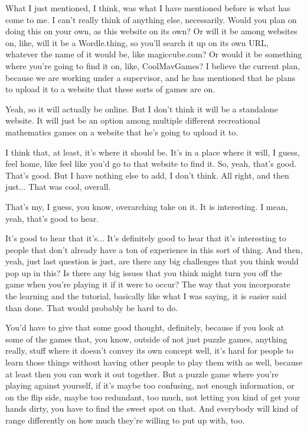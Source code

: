 \documentclass{article}
\begin{document}
What I just mentioned, I think, was what I have mentioned before is what has come to me. I can't
really think of anything else, necessarily. Would you plan on doing this on your own, as this
website on its own? Or will it be among websites on, like, will it be a Wordle.thing, so you'll search
it up on its own URL, whatever the name of it would be, like magiccube.com? Or would it be
something where you're going to find it on, like, CoolMavGames? I believe the current plan,
because we are working under a supervisor, and he has mentioned that he plans to upload it to a
website that these sorts of games are on.

Yeah, so it will actually be online. But I don't think it will be a standalone website. It will just be an
option among multiple different recreational mathematics games on a website that he's going to
upload it to.

I think that, at least, it's where it should be. It's in a place where it will, I guess, feel home, like feel
like you'd go to that website to find it. So, yeah, that's good.
That's good. But I have nothing else to add, I don't think. All right, and then just... That was cool,
overall.

That's my, I guess, you know, overarching take on it. It is interesting. I mean, yeah, that's good to
hear.

It's good to hear that it's... It's definitely good to hear that it's interesting to people that don't
already have a ton of experience in this sort of thing. And then, yeah, just last question is just, are
there any big challenges that you think would pop up in this? Is there any big issues that you
think might turn you off the game when you're playing it if it were to occur? The way that you
incorporate the learning and the tutorial, basically like what I was saying, it is easier said than
done. That would probably be hard to do.

You'd have to give that some good thought, definitely, because if you look at some of the games
that, you know, outside of not just puzzle games, anything really, stuff where it doesn't convey its
own concept well, it's hard for people to learn those things without having other people to play
them with as well, because at least then you can work it out together. But a puzzle game where
you're playing against yourself, if it's maybe too confusing, not enough information, or on the flip
side, maybe too redundant, too much, not letting you kind of get your hands dirty, you have to
find the sweet spot on that. And everybody will kind of range differently on how much they're
willing to put up with, too.
\end{document}
